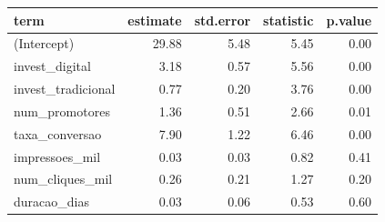 \begin{table}[ht]
\centering
\begin{tabular}{lrrrr}
  \hline
term & estimate & std.error & statistic & p.value \\ 
  \hline
(Intercept) & 29.88 & 5.48 & 5.45 & 0.00 \\ 
  invest\_digital & 3.18 & 0.57 & 5.56 & 0.00 \\ 
  invest\_tradicional & 0.77 & 0.20 & 3.76 & 0.00 \\ 
  num\_promotores & 1.36 & 0.51 & 2.66 & 0.01 \\ 
  taxa\_conversao & 7.90 & 1.22 & 6.46 & 0.00 \\ 
  impressoes\_mil & 0.03 & 0.03 & 0.82 & 0.41 \\ 
  num\_cliques\_mil & 0.26 & 0.21 & 1.27 & 0.20 \\ 
  duracao\_dias & 0.03 & 0.06 & 0.53 & 0.60 \\ 
   \hline
\end{tabular}
\end{table}
